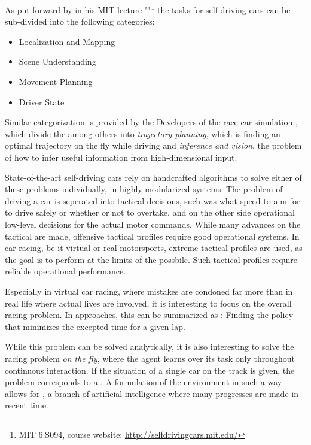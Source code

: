 As put forward by  in his MIT lecture ""\footnote{MIT 6.S094, course website: \url{http://selfdrivingcars.mit.edu/}} the tasks for self-driving cars can be sub-divided into the following categories: 
\begin{itemize} 
	\item Localization and Mapping
	\item Scene Understanding
	\item Movement Planning
	\item Driver State
\end{itemize}

Similar categorization is provided by the Developers of the race car simulation \cite{wymann_torcs_2015}, which divide the  among others into \textit{trajectory planning}, which is finding an optimal trajectory on the fly while driving and \textit{inference and vision}, the problem of how to infer useful information from high-dimensional input.

State-of-the-art self-driving cars rely on handcrafted algorithms to solve either of these problems individually, in highly modularized systems. The problem of driving a car is seperated into tactical decisions, such was what speed to aim for to drive safely or whether or not to overtake, and on the other side operational low-level decisions for the actual motor commands. While many advances on the tactical are made, offensive tactical profiles require good operational systems. In car racing, be it virtual or real motorsports, extreme tactical profiles are used, as the goal is to perform at the limits of the possbile. Such tactical profiles require reliable operational performance.

Especially in virtual car racing, where mistakes are condoned far more than in real life where actual lives are involved, it is interesting to focus on the overall racing problem. In  approaches, this can be summarized as : Finding the policy that minimizes the excepted time for a given lap. 

While this problem can be solved analytically, it is also interesting to solve the racing problem \textit{on the fly}, where the agent learns over its task only throughout continuous interaction. If the situation of a single car on the track is given, the problem corresponds to a . A formulation of the environment in such a way allows for , a branch of artificial intelligence where many progresses are made in recent time.

